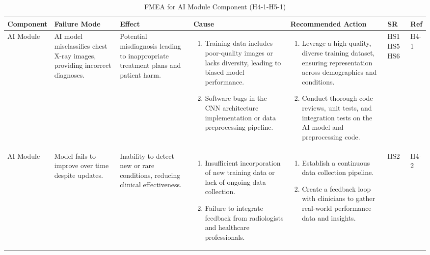 \documentclass{article}
\begin{document}
\begin{landscape}
    \begin{table}[ht]
    \centering
    \caption{FMEA for AI Module Component (H4-1-H5-1)}
    \renewcommand{\arraystretch}{1.1}
    {
    \setlength{\tabcolsep}{2pt}
    \begin{tabular}{|p{2.5cm}|p{2.5cm}|p{3cm}|p{5cm}|p{6cm}|p{1cm}|p{1cm}|}
    \hline
    \textbf{Component} & \textbf{Failure Mode} & \textbf{Effect} & \textbf{Cause} & \textbf{Recommended Action} & \textbf{SR} & \textbf{Ref} \\
    \hline

    AI Module
     & AI model misclassifies chest X-ray images, providing incorrect diagnoses.
     & Potential misdiagnosis leading to inappropriate treatment plans and patient harm.
     &
     \begin{enumerate}[leftmargin=*, label={\alph*.}, itemsep=1pt]
         \item Training data includes poor-quality images or lacks diversity, leading to biased model performance.
         \item Software bugs in the CNN architecture implementation or data preprocessing pipeline.
     \end{enumerate}
     &
     \begin{enumerate}[leftmargin=*, label={\alph*.}, itemsep=1pt]
         \item Levrage a high-quality, diverse training dataset, ensuring representation across demographics and conditions.
         \item Conduct thorough code reviews, unit tests, and integration tests on the AI model and preprocessing code.
     \end{enumerate}
     & HS1 \newline HS5 \newline HS6 & H4-1 \\ \hline

    AI Module
     & Model fails to improve over time despite updates.
     & Inability to detect new or rare conditions, reducing clinical effectiveness.
     &
     \begin{enumerate}[leftmargin=*, label={\alph*.}, itemsep=1pt]
         \item Insufficient incorporation of new training data or lack of ongoing data collection.
         \item Failure to integrate feedback from radiologists and healthcare professionals.
     \end{enumerate}
     &
     \begin{enumerate}[leftmargin=*, label={\alph*.}, itemsep=1pt]
         \item Establish a continuous data collection pipeline.
         \item Create a feedback loop with clinicians to gather real-world performance data and insights.
     \end{enumerate}
     & HS2 & H4-2 \\ \hline


\end{tabular}}
\end{table}
\end{landscape}
\end{document}
